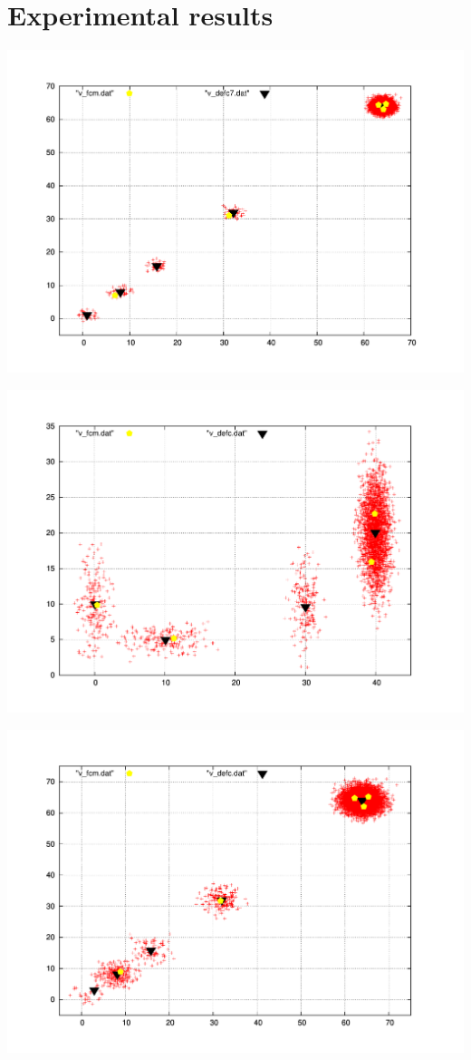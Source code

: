 \documentclass[a4paper]{article}
\begin{document}
\section{Experimental results}

\begin{center}
\includegraphics[scale=0.4]{gauss1FINALE.pdf}
\end{center}
\begin{center}
\includegraphics[scale=0.4]{gauss4_finale.pdf}
\end{center}
\begin{center}
\includegraphics[scale=0.4]{gauss5FINALE.pdf}
\end{center}
\end{document}
